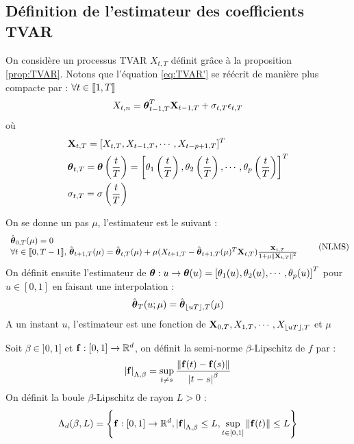 \documentclass{report}
\begin{document}
\subsection{Définition de l'estimateur des coefficients TVAR}
On considère un processus TVAR $X_{t,T}$ définit grâce à la proposition \ref{prop:TVAR}. Notons que l'équation \eqref{eq:TVAR'} se réécrit de manière plus compacte par : $\forall t \in { \left\llbracket 1,T \right\rrbracket}$
$$
X_{t,n} = \boldsymbol{\theta}_{t-1,T}^T \mathbf{X}_{t-1,T} + \sigma_{t,T} \epsilon_{t,T}
$$
où 
\begin{align*}
&\mathbf{X}_{t,T} = [X_{t,T}, X_{t-1,T}, \cdots , X_{t-p+1,T} ]^T \\
&\boldsymbol{\theta}_{t,T} = \boldsymbol{\theta}\left(\frac{t}{T}\right) = \left[ \theta_1\left(\frac{t}{T}\right), \theta_2\left(\frac{t}{T}\right), \cdots, \theta_p\left(\frac{t}{T}\right) \right]^T \\
&\sigma_{t,T} = \sigma\left(\frac{t}{T}\right)
\end{align*}
\begin{Def}
On se donne un pas $\mu$, l'estimateur est le suivant :
\begin{equation}\label{eq:NLSM}
\begin{array}{l}
\hat{\boldsymbol{\theta}}_{0,T}(\mu) = 0 \\
\forall t \in { \left\llbracket 0,T-1 \right\rrbracket}, \, \hat{\boldsymbol{\theta}}_{t+1,T}(\mu) = \hat{\boldsymbol{\theta}}_{t,T}(\mu) + \mu ( X_{t+1,T} - \hat{\boldsymbol{\theta}}_{t+1,T}(\mu)^T \mathbf{X}_{t,T} ) \frac{\mathbf{X}_{t,T}}{1+\mu { \left\| \mathbf{X}_{t,T} \right\|}^2}
\end{array}
\tag{NLMS}
\end{equation}
On définit ensuite l'estimateur de $\boldsymbol{\theta} : u \rightarrow \boldsymbol{\theta}(u) = \left[ \theta_1(u), \theta_2(u), \cdots, \theta_p(u) \right]^T$ pour $u\in [0,1]$ en faisant une interpolation :
$$
\hat{\boldsymbol{\theta}}_T(u ; \mu) = \hat{\boldsymbol{\theta}}_{{ \left\lfloor uT \right\rfloor },T}(\mu)
$$
A un instant $u$, l'estimateur est une fonction de $\mathbf{X}_{0,T}, X_{1,T}, \cdots , X_{{ \left\lfloor uT \right\rfloor },T}$ et $\mu$
\end{Def}
\begin{Def}
Soit $\beta \in ]0,1]$ et $\mathbf{f} : [0,1] \to \mathbb{R}^d$, on définit la semi-norme $\beta$-Lipschitz de $f$ par :
$$
{ \left| \mathbf{f} \right|}_{\Lambda,\beta} = \sup_{t\neq s} \frac{{ \left\| \mathbf{f}(t)-\mathbf{f}(s) \right\|}}{{ \left| t-s \right|}^\beta}
$$
On définit la boule $\beta$-Lipschitz de rayon $L > 0$ : 
$$
\Lambda_d(\beta,L) = { \left\lbrace  \mathbf{f} : [0,1] \to \mathbb{R}^d, { \left| \mathbf{f} \right|}_{\Lambda,\beta} \leq L, \sup_{t\in [0,1]} { \left\| \mathbf{f}(t) \right\|} \leq L  \right\rbrace }
$$
\end{Def}
\end{document}
